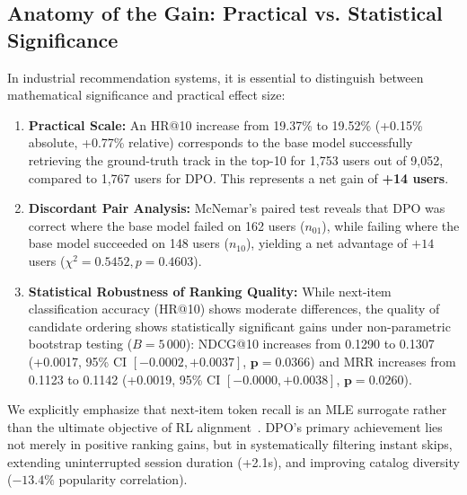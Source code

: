 \subsection{Anatomy of the Gain: Practical vs. Statistical Significance}
In industrial recommendation systems, it is essential to distinguish between mathematical significance and practical effect size:
\begin{enumerate}
    \item \textbf{Practical Scale:} An HR@10 increase from 19.37\% to 19.52\% (+0.15\% absolute, +0.77\% relative) corresponds to the base model successfully retrieving the ground-truth track in the top-10 for 1,753 users out of 9,052, compared to 1,767 users for DPO. This represents a net gain of \textbf{+14 users}.
    \item \textbf{Discordant Pair Analysis:} McNemar's paired test reveals that DPO was correct where the base model failed on 162 users ($n_{01}$), while failing where the base model succeeded on 148 users ($n_{10}$), yielding a net advantage of $+14$ users ($\chi^2 = 0.5452, p = 0.4603$).
    \item \textbf{Statistical Robustness of Ranking Quality:} While next-item classification accuracy (HR@10) shows moderate differences, the quality of candidate ordering shows statistically significant gains under non-parametric bootstrap testing ($B=5\,000$): NDCG@10 increases from 0.1290 to 0.1307 (+0.0017, 95\% CI $[-0.0002, +0.0037]$, $\mathbf{p = 0.0366}$) and MRR increases from 0.1123 to 0.1142 (+0.0019, 95\% CI $[-0.0000, +0.0038]$, $\mathbf{p = 0.0260}$).
\end{enumerate}

We explicitly emphasize that next-item token recall is an MLE surrogate rather than the ultimate objective of RL alignment~\cite{matveev2026session}. DPO's primary achievement lies not merely in positive ranking gains, but in systematically filtering instant skips, extending uninterrupted session duration (+2.1s), and improving catalog diversity ($-13.4\%$ popularity correlation).

